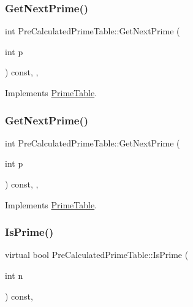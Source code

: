 \subsubsection{\texorpdfstring{GetNextPrime()}{GetNextPrime()}\hspace{0.1cm}{\footnotesize\ttfamily [2/3]}}
{\footnotesize\ttfamily int Pre\+Calculated\+Prime\+Table\+::\+Get\+Next\+Prime (\begin{DoxyParamCaption}\item[{int}]{p }\end{DoxyParamCaption}) const\hspace{0.3cm}{\ttfamily [inline]}, {\ttfamily [override]}, {\ttfamily [virtual]}}



Implements \mbox{\hyperlink{class_prime_table_ae537c939f56617d8937d57bbbae3ab30}{Prime\+Table}}.

\mbox{\label{class_pre_calculated_prime_table_a0b99de0a790db9f0cc2b3cd4b527fd5a}} 
\subsubsection{\texorpdfstring{GetNextPrime()}{GetNextPrime()}\hspace{0.1cm}{\footnotesize\ttfamily [3/3]}}
{\footnotesize\ttfamily int Pre\+Calculated\+Prime\+Table\+::\+Get\+Next\+Prime (\begin{DoxyParamCaption}\item[{int}]{p }\end{DoxyParamCaption}) const\hspace{0.3cm}{\ttfamily [inline]}, {\ttfamily [override]}, {\ttfamily [virtual]}}



Implements \mbox{\hyperlink{class_prime_table_ae537c939f56617d8937d57bbbae3ab30}{Prime\+Table}}.

\mbox{\label{class_pre_calculated_prime_table_a8a9ab7f99b09e5e987933c260e7304cf}} 
\subsubsection{\texorpdfstring{IsPrime()}{IsPrime()}\hspace{0.1cm}{\footnotesize\ttfamily [1/3]}}
{\footnotesize\ttfamily virtual bool Pre\+Calculated\+Prime\+Table\+::\+Is\+Prime (\begin{DoxyParamCaption}\item[{int}]{n }\end{DoxyParamCaption}) const\hspace{0.3cm}{\ttfamily [inline]}, {\ttfamily [virtual]}}



